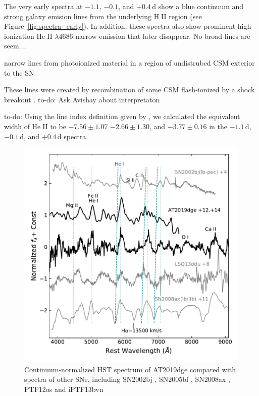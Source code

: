 \documentclass[twocolumn]{aastex63}
\def\ion#1#2{#1$\;${\footnotesize\rm{#2}}\relax}
\newcommand{\todo}[1]{{\color{magenta} to-do: {#1}}}
\begin{document}
\begin{CJK*}{UTF8}{gbsn}
The very early spectra at $-1.1$, $-0.1$, and $+0.4$\,d show a blue continuum and strong galaxy 
emision lines from the underlying \ion{H}{II} region (see Figure~\ref{fig:spectra_early}). In addition. 
these spectra also show prominent high-ionization \ion{He}{II} $\lambda4686$ narrow emission that 
later disappear. No broad 
lines are seem....

narrow lines from photoionized material in a region of undistrubed CSM exterior to the SN 
\citep{Leonard2000}

These lines were created by recombination of some CSM flash-ionized by a shock breakout 
\citep{Khazov2016} . \todo{Ask Avishay 
about interpretaton}

\todo{Using the line index definition given by \citet{Khazov2016}, we calculated the equivalent width of 
\ion{He}{II} to be $-7.56\pm 1.07$ $-2.66\pm 1.30$, and $-3.77\pm 0.16$ in the $-1.1$\,d, $-0.1$\,d, 
and $+0.4$\,d spectra.}

\begin{figure}[htbp!]
	\centering
	\includegraphics[width=\columnwidth]{figures/hst_opt.pdf}
	\caption{Continuum-normalized HST spectrum of AT2019dge compared with spectra of other SNe, 
	including SN2002bj \citep{Poznanski2010}, SN2005bf \citep{Folatelli2006}, SN2008ax 
	\citep{Chornock2011}, PTF12os and iPTF13bvn \citep{Fremling2016}
		\label{fig:hst_opt}}
\end{figure}

\end{CJK*}
\end{document}
